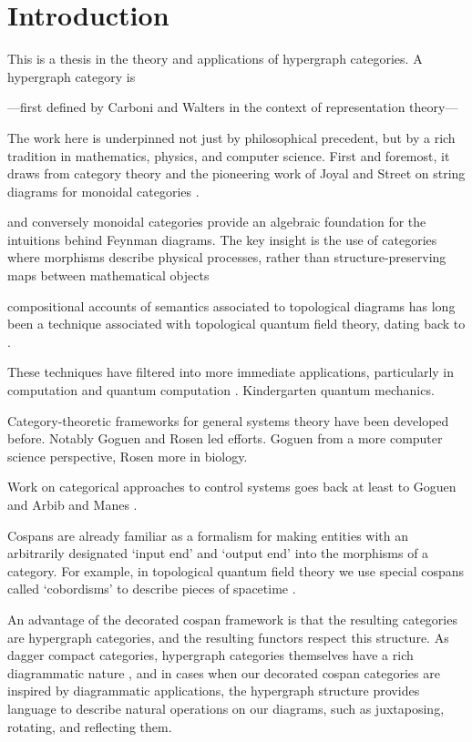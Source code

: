 {}
\chapter*{Introduction}

This is a thesis in the theory and applications of hypergraph categories. A
hypergraph category is 

---first defined by Carboni and Walters \cite{CW, Ca} in the context of
representation theory---

The work here is underpinned not just by philosophical precedent, but by a rich
tradition in mathematics, physics, and computer science. First and foremost, it
draws from category theory and the pioneering work of Joyal and
Street on string diagrams for monoidal categories \cite{JS91,JS93}.

and conversely monoidal categories
provide an algebraic foundation for the intuitions behind Feynman diagrams.  The
key insight is the use of categories where morphisms describe physical
processes, rather than structure-preserving maps between mathematical objects
\cite{BaezStay,CP}
 
  compositional accounts of semantics associated to topological
diagrams has long been a technique associated with topological
quantum field theory, dating back to \cite{At}.

These techniques have filtered into more immediate applications, particularly in
computation and quantum computation \cite{AC04,Ba1,Sel07}. 
Kindergarten quantum mechanics. 

Category-theoretic frameworks for general systems theory have been developed
before. Notably Goguen and Rosen led efforts. Goguen from a more computer
science perspective, Rosen more in biology.


Work on categorical approaches to control systems goes back at least to Goguen
\cite{Go} and Arbib and Manes \cite{AM}. 



Cospans are already familiar as a formalism for making entities with an
arbitrarily designated `input end' and `output end' into the morphisms of a
category.  For example, in topological quantum field theory we use special
cospans called `cobordisms' to describe pieces of spacetime \cite{BL,BaezStay}.

An advantage of the decorated cospan framework is that the resulting categories
are hypergraph categories, and the resulting functors respect this structure.
As dagger compact categories, hypergraph categories themselves have a rich
diagrammatic nature \cite{Sel11}, and in cases when our decorated cospan categories
are inspired by diagrammatic applications, the hypergraph structure provides
language to describe natural operations on our diagrams, such as juxtaposing,
rotating, and reflecting them.

